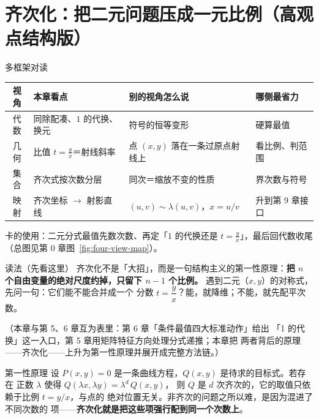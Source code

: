 
\section{齐次化：把二元问题压成一元比例（高观点结构版）}

\begin{methodbox}{多框架对读}
\small
\begin{center}
\begin{tabular}{c|p{2.9cm}|p{5.0cm}|p{3.1cm}}
\toprule
视角 & 本章看点 & 别的视角怎么说 & 哪侧最省力 \\
\midrule
代数 & 同除配凑、$1$ 的代换、换元 & 符号的恒等变形 & 硬算最值 \\
几何 & 比值 $t=\frac yx$＝射线斜率 & 点 $(x,y)$ 落在一条过原点射线上 & 看比例、判范围 \\
集合 & 齐次式按次数分层 & 同次＝缩放不变的性质 & 界次数与符号 \\
映射 & 齐次坐标 $\to$ 射影直线 & $(u,v)\sim\lambda(u,v)$，$x=u/v$ & 升到第 9 章接口 \\
\bottomrule
\end{tabular}
\end{center}
卡的使用：二元分式最值先数次数、再定「$1$ 的代换还是 $t=\frac yx$」，最后回代数收尾（总图见第 0 章图~\ref{fig:four-view-map}）。
\end{methodbox}

\begin{warmupbox}{读法（先看这里）}
齐次化不是「大招」，而是一句结构主义的第一性原理：\textbf{把
$n$ 个自由变量的绝对尺度约掉，只留下 $n-1$ 个比例。}
遇到二元（$x,y$）的对称式，先问一句：它们能不能合并成一个
分数 $t=\dfrac{y}{x}$？能，就降维；不能，就先配平次数。

（本章与第 5、6 章互为表里：第 6 章「条件最值四大标准动作」给出
「1 的代换」这一入口，第 5 章用矩阵特征方向处理分式递推；本章把
两者背后的原理——齐次化——上升为第一性原理并展开成完整方法链。）
\end{warmupbox}

\begin{corebox}{第一性原理}
设 $P(x,y)=0$ 是一条曲线方程，$Q(x,y)$ 是待求的目标式。若存在
正数 $\lambda$ 使得 $Q(\lambda x,\lambda y)=\lambda^{d}\,Q(x,y)$，
则 $Q$ 是 $d$ 次齐次的，它的取值只依赖于比例 $t=y/x$，与点的
绝对位置无关。非齐次的问题之所以难，是因为混进了不同次数的
项——\textbf{齐次化就是把这些项强行配到同一个次数上}。
\end{corebox}


